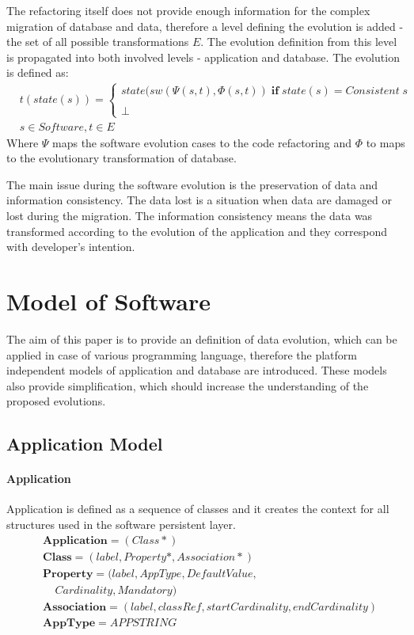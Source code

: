 \documentclass[runningheads]{comsis}
\begin{document}
The refactoring itself does not provide enough information for the complex migration of database and data, therefore a level defining the evolution is added - the set of all possible transformations $E$. The evolution definition from this level is propagated into both involved levels - application and database. The evolution is defined as:
\begin{align}
& t(state(s)) = \begin{cases}
state(sw(\Psi(s, t), \Phi(s,t)) \; \mathbf{if} \; state(s) = Consistent \; s\\\\
 	\perp
\end{cases}\\ 
& s \in Software, t \in E \nonumber
\end{align}
Where $\Psi$ maps the software evolution cases to the code refactoring and $\Phi$ to maps to the evolutionary transformation of database.

The main issue during the software evolution is the preservation of data and information consistency. The data lost is a situation when data are damaged or lost during the migration. The information consistency means the data was transformed according to the evolution of the application and they correspond with developer's intention. 

\section{Model of Software}
\label{sec:models}
The aim of this paper is to provide an definition of data evolution, which can be applied in case of various programming language, therefore the platform independent models of application and database are introduced. These models also provide simplification, which should increase the understanding of the proposed evolutions.

\subsection{Application Model}
\paragraph{Application} Application is defined as a sequence of classes and it creates the context for all structures used in the software persistent layer.
\begin{align}
& \mathbf{Application} = (Class*) \\
& 	\mathbf{Class} = (label, Property*, Association*) \\
& \mathbf{Property} = (label, AppType, DefaultValue, \nonumber \\ & \;\;\;\;  Cardinality, Mandatory) \\
&	\mathbf{Association} = (label, classRef, startCardinality, endCardinality)  \\
& \mathbf{AppType} = APPSTRING
\end{align}
\end{document}
